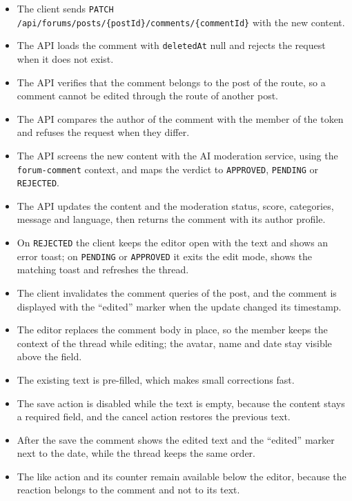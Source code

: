 \begin{itemize}[leftmargin=1.6em,topsep=3pt,itemsep=2pt,parsep=0pt,label=$\bullet$]
      \item The client sends \texttt{PATCH
                  /api/forums/posts/\{postId\}/comments/\{commentId\}} with the new content.
      \item The API loads the comment with \texttt{deletedAt} null and rejects the request
            when it does not exist.
      \item The API verifies that the comment belongs to the post of the route, so a
            comment cannot be edited through the route of another post.
      \item The API compares the author of the comment with the member of the token and
            refuses the request when they differ.
      \item The API screens the new content with the AI moderation service, using the
            \texttt{forum-comment} context, and maps the verdict to \texttt{APPROVED},
            \texttt{PENDING} or \texttt{REJECTED}.
      \item The API updates the content and the moderation status, score, categories,
            message and language, then returns the comment with its author profile.
      \item On \texttt{REJECTED} the client keeps the editor open with the text and shows
            an error toast; on \texttt{PENDING} or \texttt{APPROVED} it exits the edit
            mode, shows the matching toast and refreshes the thread.
      \item The client invalidates the comment queries of the post, and the comment is
            displayed with the ``edited'' marker when the update changed its timestamp.
\end{itemize}

\begin{itemize}[leftmargin=1.6em,topsep=3pt,itemsep=2pt,parsep=0pt,label=$\bullet$]
      \item The editor replaces the comment body in place, so the member keeps the context
            of the thread while editing; the avatar, name and date stay visible above the
            field.
      \item The existing text is pre-filled, which makes small corrections fast.
      \item The save action is disabled while the text is empty, because the content stays
            a required field, and the cancel action restores the previous text.
      \item After the save the comment shows the edited text and the ``edited'' marker next
            to the date, while the thread keeps the same order.
      \item The like action and its counter remain available below the editor, because the
            reaction belongs to the comment and not to its text.
\end{itemize}


